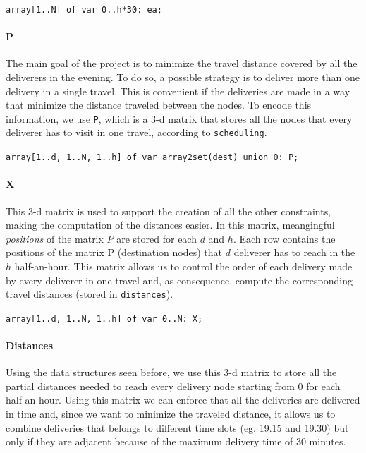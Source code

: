 \documentclass[10pt]{article}
\begin{document}
	\begin{center}
		\texttt{array[1..N] of var 0..h*30: ea;}
	\end{center}
	

	\paragraph*{P} The main goal of the project is to minimize the travel distance 
	covered by all the deliverers in the evening. To do so, a possible strategy
	is to deliver more than one delivery in a single travel. This is convenient 
	if the deliveries are made in a way that minimize the distance traveled between the nodes.
	To encode this information, we use \texttt{P}, which is a 3-d matrix that stores
	all the nodes that every deliverer has to visit in one travel, according to \texttt{scheduling}. 

	\begin{center}
		\texttt{array[1..d, 1..N, 1..h] of var array2set(dest) union {0}: P;}
	\end{center}
	
	\paragraph*{X} This 3-d matrix is used to support the creation of all the other 
	constraints, making the computation of the distances easier.
	In this matrix, meangingful \textit{positions} of the matrix $P$ are stored for each 
	$d$ and $h$. Each row contains the positions of the matrix P (destination nodes) 
	that $d$ deliverer has to reach in the $h$ half-an-hour. This matrix allows 
	us to control the order of each delivery made by every deliverer in one travel
	and, as consequence, compute the corresponding travel distances (stored in \texttt{distances}).

	\begin{center}
		\texttt{array[1..d, 1..N, 1..h] of var 0..N: X;}
	\end{center}

	\paragraph*{Distances}
	Using the data structures seen before, we use this 3-d matrix to store all
	the partial distances needed to reach every delivery node starting from 0 for each
	half-an-hour. Using this matrix we can enforce that all the deliveries are delivered in 
	time and, since we want to minimize the traveled distance, it allows us to combine deliveries that belongs to different
	time slots (eg. 19.15 and 19.30) but only if they are adjacent because of the maximum 
	delivery time of 30 minutes.
\end{document}
